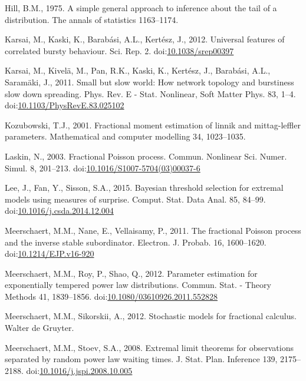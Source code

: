 \documentclass[]{elsarticle} %
\begin{document}
\leavevmode\hypertarget{ref-hill1975simple}{}%
Hill, B.M., 1975. A simple general approach to inference about the tail
of a distribution. The annals of statistics 1163--1174.

\leavevmode\hypertarget{ref-Karsai2012}{}%
Karsai, M., Kaski, K., Barabási, A.L., Kertész, J., 2012. Universal
features of correlated bursty behaviour. Sci. Rep. 2.
doi:\href{https://doi.org/10.1038/srep00397}{10.1038/srep00397}

\leavevmode\hypertarget{ref-Karsai2011}{}%
Karsai, M., Kivelä, M., Pan, R.K., Kaski, K., Kertész, J., Barabási,
A.L., Saramäki, J., 2011. Small but slow world: How network topology and
burstiness slow down spreading. Phys. Rev. E - Stat. Nonlinear, Soft
Matter Phys. 83, 1--4.
doi:\href{https://doi.org/10.1103/PhysRevE.83.025102}{10.1103/PhysRevE.83.025102}

\leavevmode\hypertarget{ref-kozubowski2001}{}%
Kozubowski, T.J., 2001. Fractional moment estimation of linnik and
mittag-leffler parameters. Mathematical and computer modelling 34,
1023--1035.

\leavevmode\hypertarget{ref-Laskin2003}{}%
Laskin, N., 2003. Fractional Poisson process. Commun. Nonlinear Sci.
Numer. Simul. 8, 201--213.
doi:\href{https://doi.org/10.1016/S1007-5704(03)00037-6}{10.1016/S1007-5704(03)00037-6}

\leavevmode\hypertarget{ref-Lee15}{}%
Lee, J., Fan, Y., Sisson, S.A., 2015. Bayesian threshold selection for
extremal models using measures of surprise. Comput. Stat. Data Anal. 85,
84--99.
doi:\href{https://doi.org/10.1016/j.csda.2014.12.004}{10.1016/j.csda.2014.12.004}

\leavevmode\hypertarget{ref-Meerschaert2010b}{}%
Meerschaert, M.M., Nane, E., Vellaisamy, P., 2011. The fractional
Poisson process and the inverse stable subordinator. Electron. J.
Probab. 16, 1600--1620.
doi:\href{https://doi.org/10.1214/EJP.v16-920}{10.1214/EJP.v16-920}

\leavevmode\hypertarget{ref-MeerschaertRoyQin}{}%
Meerschaert, M.M., Roy, P., Shao, Q., 2012. Parameter estimation for
exponentially tempered power law distributions. Commun. Stat. - Theory
Methods 41, 1839--1856.
doi:\href{https://doi.org/10.1080/03610926.2011.552828}{10.1080/03610926.2011.552828}

\leavevmode\hypertarget{ref-MeerschaertSikorskii}{}%
Meerschaert, M.M., Sikorskii, A., 2012. Stochastic models for fractional
calculus. Walter de Gruyter.

\leavevmode\hypertarget{ref-MeerschaertStoev08}{}%
Meerschaert, M.M., Stoev, S.A., 2008. Extremal limit theorems for
observations separated by random power law waiting times. J. Stat. Plan.
Inference 139, 2175--2188.
doi:\href{https://doi.org/10.1016/j.jspi.2008.10.005}{10.1016/j.jspi.2008.10.005}
\end{document}
